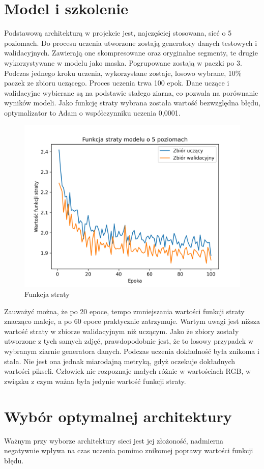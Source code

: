 \documentclass[a4paper, 12pt]{article}
\begin{document}
\section{Model i szkolenie}
Podstawową architekturą w projekcie jest, najczęściej stosowana, sieć o 5 poziomach. \cite{ronneberger2015unet}
Do procesu uczenia utworzone zostają generatory danych testowych i walidacyjnych.
Zawierają one skompresowane oraz oryginalne segmenty, te drugie wykorzystywane w modelu jako maska.
Pogrupowane zostają w paczki po 3.
Podczas jednego kroku uczenia, wykorzystane zostaje, losowo wybrane, 10\% paczek ze zbioru uczącego.
Proces uczenia trwa 100 epok.
Dane uczące i walidacyjne wybierane są na podstawie stałego ziarna, co pozwala na porównanie wyników modeli.
Jako funkcję straty wybrana została wartość bezwzględna błędu, optymalizator to Adam o współczynniku uczenia 0,0001.

\begin{figure}[h!]
\begin{center}
	\includegraphics[width=0.7\columnwidth]{loss5.png}
	\caption{Funkcja straty}
\end{center}
\end{figure}

Zauważyć można, że po 20 epoce, tempo zmniejszania wartości funkcji straty znacząco maleje,
a po 60 epoce praktycznie zatrzymuje.
Wartym uwagi jest niższa wartość straty w zbiorze walidacyjnym niż uczącym. Jako że zbiory zostały utworzone z tych samych zdjęć,
prawdopodobnie jest, że to losowy przypadek w wybranym ziarnie generatora danych.
Podczas uczenia dokładność była znikoma i stała. Nie jest ona jednak miarodajną metryką, gdyż oczekuje dokładnych wartości pikseli.
Człowiek nie rozpoznaje małych różnic w wartościach RGB, w związku z czym ważna była jedynie wartość funkcji straty.
\newpage
\section{Wybór optymalnej architektury}
Ważnym przy wyborze architektury sieci jest jej złożoność, nadmierna negatywnie wpływa na czas uczenia pomimo znikomej poprawy wartości funkcji błędu.
\end{document}
